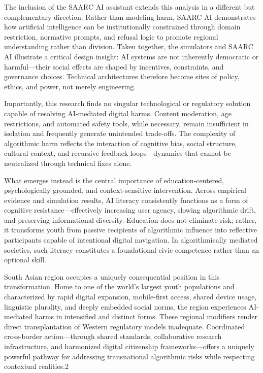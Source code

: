 \documentclass[12pt,a4paper]{report}
\begin{document}
The inclusion of the SAARC AI assistant extends this analysis in a different but complementary direction. Rather than modeling harm, SAARC AI demonstrates how artificial intelligence can be institutionally constrained through domain restriction, normative prompts, and refusal logic to promote regional understanding rather than division. Taken together, the simulators and SAARC AI illustrate a critical design insight: AI systems are not inherently democratic or harmful—their social effects are shaped by incentives, constraints, and governance choices. Technical architectures therefore become sites of policy, ethics, and power, not merely engineering.

Importantly, this research finds no singular technological or regulatory solution capable of resolving AI-mediated digital harms. Content moderation, age restrictions, and automated safety tools, while necessary, remain insufficient in isolation and frequently generate unintended trade-offs. The complexity of algorithmic harm reflects the interaction of cognitive bias, social structure, cultural context, and recursive feedback loops—dynamics that cannot be neutralized through technical fixes alone.

What emerges instead is the central importance of education-centered, psychologically grounded, and context-sensitive intervention. Across empirical evidence and simulation results, AI literacy consistently functions as a form of cognitive resistance—effectively increasing user agency, slowing algorithmic drift, and preserving informational diversity. Education does not eliminate risk; rather, it transforms youth from passive recipients of algorithmic influence into reflective participants capable of intentional digital navigation. In algorithmically mediated societies, such literacy constitutes a foundational civic competence rather than an optional skill.

South Asian region occupies a uniquely consequential position in this transformation. Home to one of the world’s largest youth populations and characterized by rapid digital expansion, mobile-first access, shared device usage, linguistic plurality, and deeply embedded social norms, the region experiences AI-mediated harms in intensified and distinct forms. These regional modifiers render direct transplantation of Western regulatory models inadequate. Coordinated cross-border action—through shared standards, collaborative research infrastructure, and harmonized digital citizenship frameworks—offers a uniquely powerful pathway for addressing transnational algorithmic risks while respecting contextual realities.2
\end{document}
